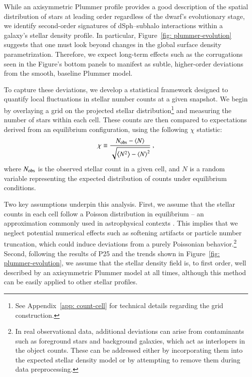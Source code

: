 \documentclass[fleqn,usenatbib]{mnras}
\begin{document}
While an axisymmetric Plummer profile provides a good description of the spatial distribution of stars at leading order regardless of the dwarf’s evolutionary stage, we identify second-order signatures of dSph–subhalo interactions within a galaxy’s stellar density profile. In particular, Figure~\ref{fig: plummer-evolution} suggests that one must look beyond changes in the global surface density parametrization. Therefore, we expect long-term effects such as the corrugations seen in the Figure's bottom panels to manifest as subtle, higher-order deviations from the smooth, baseline Plummer model.

To capture these deviations, we develop a statistical framework designed to quantify local fluctuations in stellar number counts at a given snapshot. We begin by overlaying a grid on the projected stellar distribution\footnote{See Appendix~\ref{app: count-cell} for technical details regarding the grid construction.} and measuring the number of stars within each cell. These counts are then compared to expectations derived from an equilibrium configuration, using the following $\chi$ statistic:
\begin{equation} \label{eq: chi-measure}
\chi \equiv \frac{N_{\rm obs} - \left<N\right>}{\sqrt{\left<N^{2}\right> - \left<N\right>^{2}}} \ ,
\end{equation}
where $N_{\rm obs}$ is the observed stellar count in a given cell, and $N$ is a random variable representing the expected distribution of counts under equilibrium conditions.

Two key assumptions underpin this analysis. First, we assume that the stellar counts in each cell follow a Poisson distribution in equilibrium -- an approximation commonly used in astrophysical contexts \citep[e.g.][]{Bahcall&Soneira80}. This implies that we neglect potential numerical effects such as softening artifacts or particle number truncation, which could induce deviations from a purely Poissonian behavior.\footnote{In real observational data, additional deviations can arise from contaminants such as foreground stars and background galaxies, which act as interlopers in the object counts. These can be addressed either by incorporating them into the expected stellar density model or by attempting to remove them during data preprocessing.} Second, following the results of P25 and the trends shown in Figure~\ref{fig: plummer-evolution}, we assume that the stellar density field is, to first order, well described by an axisymmetric Plummer model at all times, although this method can be easily applied to other stellar profiles.
\end{document}
